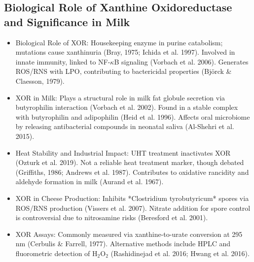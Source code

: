 \subsection*{Biological Role of Xanthine Oxidoreductase and Significance in Milk}
\begin{itemize}
    \item Biological Role of XOR:
    \subitem Housekeeping enzyme in purine catabolism; mutations cause xanthinuria (Bray, 1975; Ichida et al. 1997).
    \subitem Involved in innate immunity, linked to NF-$\kappa$B signaling (Vorbach et al. 2006).
    \subitem Generates ROS/RNS with LPO, contributing to bactericidal properties (Björck \& Claesson, 1979).

    \item XOR in Milk:
    \subitem Plays a structural role in milk fat globule secretion via butyrophilin interaction (Vorbach et al. 2002).
    \subitem Found in a stable complex with butyrophilin and adipophilin (Heid et al. 1996).
    \subitem Affects oral microbiome by releasing antibacterial compounds in neonatal saliva (Al-Shehri et al. 2015).

    \item Heat Stability and Industrial Impact:
    \subitem UHT treatment inactivates XOR (Ozturk et al. 2019).
    \subitem Not a reliable heat treatment marker, though debated (Griffiths, 1986; Andrews et al. 1987).
    \subitem Contributes to oxidative rancidity and aldehyde formation in milk (Aurand et al. 1967).

    \item XOR in Cheese Production:
    \subitem Inhibits *Clostridium tyrobutyricum* spores via ROS/RNS production (Vissers et al. 2007).
    \subitem Nitrate addition for spore control is controversial due to nitrosamine risks (Beresford et al. 2001).

    \item XOR Assays:
    \subitem Commonly measured via xanthine-to-urate conversion at 295 nm (Cerbulis \& Farrell, 1977).
    \subitem Alternative methods include HPLC and fluorometric detection of H$_2$O$_2$ (Rashidinejad et al. 2016; Hwang et al. 2016).
\end{itemize}

